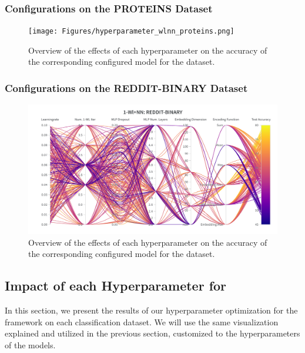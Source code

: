 \subsubsection{\wlnn Configurations on the PROTEINS Dataset}
\begin{figure}[H]
    \centering
    \texttt{[image: Figures/hyperparameter\_wlnn\_proteins.png]}
    \caption{Overview of the effects of each hyperparameter on the accuracy of the corresponding configured \wlnn model for the \proteins dataset.}
    \label{fig:wandb_wlnn_proteins}
\end{figure}

\subsubsection{\wlnn Configurations on the REDDIT-BINARY Dataset}
\begin{figure}[H]
    \centering
    \includegraphics[width=\textwidth, trim={0 75 0 150}, clip]{Figures/hyperparameter_wlnn_reddit.png}
    \caption{Overview of the effects of each hyperparameter on the accuracy of the corresponding configured \wlnn model for the \reddit dataset.}
    \label{fig:wandb_wlnn_reddit}
\end{figure}
\clearpage


\subsection{Impact of each Hyperparameter for \gnns}
In this section, we present the results of our hyperparameter optimization for the \gnn framework on each classification dataset. We will use the same visualization explained and utilized in the previous section, customized to the hyperparameters of the \gnn models.

